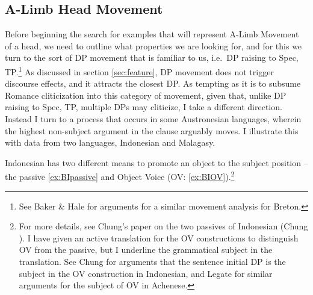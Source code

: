 \documentclass[output=paper,colorlinks,citecolor=brown,
]{langscibook}
\begin{document}
\subsection{A-Limb Head Movement}

Before beginning the search for examples that will represent A-Limb Movement of a head, we need to outline what properties we are looking for, and for this we turn to the sort of DP movement that is familiar to us, i.e.\ DP raising to Spec, TP.\footnote{See Baker \& Hale \citeyearpar{Baker:1990} for arguments for a similar movement analysis for Breton.}  As discussed in section \ref{sec:feature}, DP movement does not trigger discourse effects, and it attracts the closest DP.  As tempting as it is to subsume Romance cliticization into this category of movement, given that, unlike DP raising to Spec, TP, multiple DPs may cliticize, I take a different direction. Instead I turn to a process that occurs in some Austronesian languages, wherein  the highest non-subject argument in the clause arguably moves.  I illustrate this with data from two languages, Indonesian and Malagasy.

Indonesian has two different means to promote an object to the subject position -- the passive \ref{ex:BIpassive} and Object Voice (OV: \ref{ex:BIOV}).\footnote{For more details, see Chung's paper on the two passives of Indonesian (Chung \citeyear{Chung:1976a}). I have given an active translation for the OV constructions to distinguish OV from the passive, but I underline the grammatical subject in the translation.  See Chung \citeyearpar{Chung:1976a} for arguments that the sentence initial DP is the subject in the OV construction in Indonesian, and Legate \citeyearpar{Legate:2014} for similar arguments for the subject of OV in Achenese.}
\end{document}
